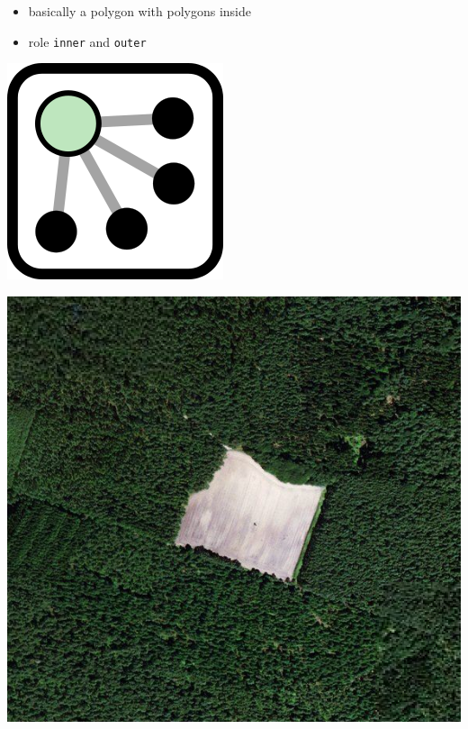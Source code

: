 \documentclass{beamer}
\begin{document}
	\begin{frame}
		\begin{itemize}
			\item basically a polygon with polygons inside
			\item role \texttt{inner} and \texttt{outer}
		\end{itemize}
		
		\vfill
		
		\begin{center}
			\begin{minipage}[b][0.6\textheight][c]{0.2\linewidth}
				\centering
				\includegraphics[width=0.5\linewidth,height=0.5\textheight,keepaspectratio]{images/240px-Mf_Relation.png}
			\end{minipage}
			\begin{minipage}[b][0.6\textheight][c]{0.4\linewidth}
				\centering
				\includegraphics[width=0.8\linewidth,height=0.8\textheight,keepaspectratio]{images/multipolygon.png}
			\end{minipage}

\end{center}
\end{frame}
\end{document}
